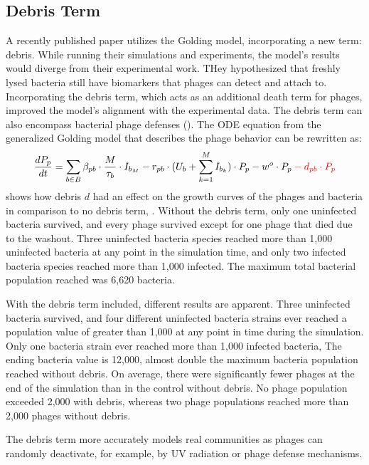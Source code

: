 \subsection{Debris Term}
\label{sec:results:debris}
A recently published paper \citet{deyEmergentHigherorderInteractions2025} utilizes the Golding model, incorporating a new term: debris. While running their simulations and experiments, the model's results would diverge from their experimental work. 
THey hypothesized that freshly lysed bacteria still have biomarkers that phages can detect and attach to. 
Incorporating the debris term, which acts as an additional death term for phages, improved the model's alignment with the experimental data.
The debris term can also encompass bacterial phage defenses (). 
The ODE equation from the generalized Golding model that describes the phage behavior can be rewritten as: 
\[
 \frac{dP_p}{dt} = \sum_{b\in B}\beta_{p b}\cdot\frac{M}{\tau_b} \cdot I_{b_M} - r_{p b}\cdot(U_b + \sum_{k=1}^{M} I_{b_k})\cdot P_p - w^o \cdot P_p \mathcolor{red}{- d_{pb} \cdot P_p}
\]
 shows how debris $d$ had an effect on the growth curves of the phages and bacteria in comparison to no debris term, . 
Without the debris term, only one uninfected bacteria survived, and every phage survived except for one phage that died due to the washout. 
Three uninfected bacteria species reached more than 1,000 uninfected bacteria at any point in the simulation time, and only two infected bacteria species reached more than 1,000 infected. 
The maximum total bacterial population reached was 6,620 bacteria. 

With the debris term included, different results are apparent. 
Three uninfected bacteria survived, and four different uninfected bacteria strains ever reached a population value of greater than 1,000 at any point in time during the simulation. 
Only one bacteria strain ever reached more than 1,000 infected bacteria, 
The ending bacteria value is 12,000, almost double the maximum bacteria population reached without debris. 
On average, there were significantly fewer phages at the end of the simulation than in the control without debris. 
No phage population exceeded 2,000 with debris, whereas two phage populations reached more than 2,000 phages without debris. 

The debris term more accurately models real communities as phages can randomly deactivate, for example, by UV radiation or phage defense mechanisms. 

